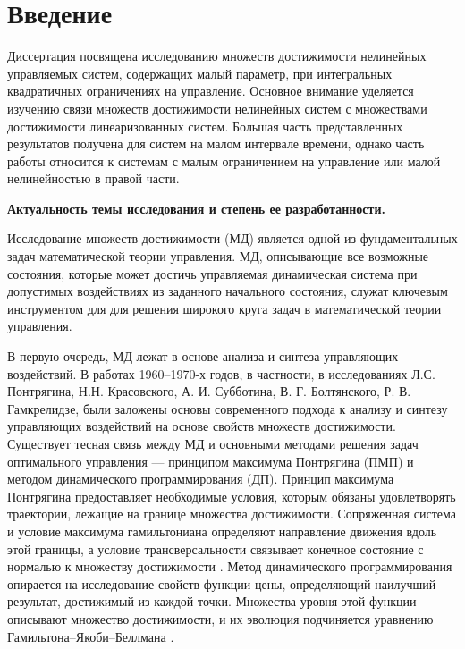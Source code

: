 \documentclass[../main.tex]{subfiles}
\begin{document}
\clearpage
\section*{Введение}
Диссертация посвящена исследованию множеств достижимости нелинейных управляемых систем, содержащих малый параметр, при интегральных квадратичных  ограничениях на управление.
Основное внимание уделяется изучению связи множеств достижимости нелинейных систем с множествами достижимости линеаризованных систем. 
Большая часть представленных результатов получена для систем на малом интервале времени, однако часть работы относится к системам с малым ограничением на управление или малой нелинейностью в правой части. 

\textbf{Актуальность темы исследования и степень ее разработанности.} 

Исследование множеств достижимости (МД) является одной из фундаментальных задач математической теории управления. 
МД, описывающие все возможные состояния, которые может достичь управляемая динамическая система при допустимых воздействиях из заданного начального состояния, служат ключевым инструментом для для решения широкого круга задач в математической теории управления. 

В первую очередь, МД лежат в основе анализа и синтеза управляющих воздействий. 
В работах 1960–1970-х годов, в частности, в исследованиях Л.С. Понтрягина, Н.Н. Красовского, А. И. Субботина, В. Г. Болтянского, Р. В. Гамкрелидзе, \cite{Pontryagin1961, Pontryagin1967, Kras_book, KrasSub, Boltyansky}  были заложены основы современного подхода к анализу и синтезу управляющих воздействий на основе свойств множеств достижимости.
Существует тесная связь между МД и основными методами решения задач оптимального управления --- принципом максимума Понтрягина (ПМП) и методом динамического программирования (ДП).
Принцип максимума Понтрягина предоставляет необходимые условия, которым обязаны удовлетворять траектории, лежащие на границе множества достижимости. 
Сопряженная система и условие максимума гамильтониана определяют направление движения вдоль этой границы, а условие трансверсальности связывает конечное состояние с нормалью к множеству достижимости \cite{Pontryagin1961, Lee}.
Метод динамического программирования опирается на исследование свойств функции цены, определяющий наилучший результат, достижимый из каждой точки. 
Множества уровня этой функции описывают множество достижимости, и их эволюция подчиняется уравнению Гамильтона–Якоби–Беллмана \cite{Bellman, Kurzhanski1977, GurmanDuhta}. 
\end{document}
